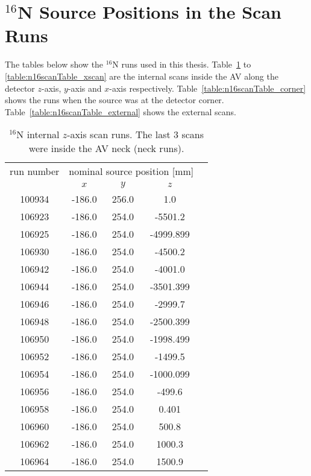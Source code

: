 \section{$^{16}$N Source Positions in the Scan Runs}\label{appendix:calibration}
The tables below show the $^{16}$N runs used in this thesis. Table~\ref{table:n16scanTable_zscan} to \ref{table:n16scanTable_xscan} are the internal scans inside the AV along the detector $z$-axis, $y$-axis and $x$-axis respectively. Table~\ref{table:n16scanTable_corner} shows the runs when the source was at the detector corner. Table~\ref{table:n16scanTable_external} shows the external scans.
\begin{table}[ht]
		\caption[$^{16}$N internal $z$-axis scan runs.]{$^{16}$N internal $z$-axis scan runs. The last 3 scans were inside the AV neck (neck runs).\label{table:n16scanTable_zscan}}
				\vspace{2mm}
			\centering
	\begin{tabular*}{90mm}{c@{\extracolsep{\fill}}*4c}
		\toprule 
		run number  & \multicolumn{3}{c}{nominal source position [mm]}  \\
                                \cline{2-4}
			& $x$ & $y$ & $z$\\
		\midrule
		100934 & -186.0 & 256.0 & 1.0\\
        106923 & -186.0 & 254.0 & -5501.2\\
        106925 & -186.0 & 254.0 & -4999.899\\
        106930 & -186.0 & 254.0 & -4500.2\\
        106942 & -186.0 & 254.0 & -4001.0\\
        106944 & -186.0 & 254.0 & -3501.399\\
        106946 & -186.0 & 254.0 & -2999.7\\
        106948 & -186.0 & 254.0 & -2500.399\\
        106950 & -186.0 & 254.0 & -1998.499\\
        106952 & -186.0 & 254.0 & -1499.5\\
        106954 & -186.0 & 254.0 & -1000.099\\
        106956 & -186.0 & 254.0 & -499.6\\
        106958 & -186.0 & 254.0 & 0.401 \\
        106960 & -186.0 & 254.0 & 500.8\\
        106962 & -186.0 & 254.0 & 1000.3\\
        106964 & -186.0 & 254.0 & 1500.9\\

\end{tabular*}
\end{table}
